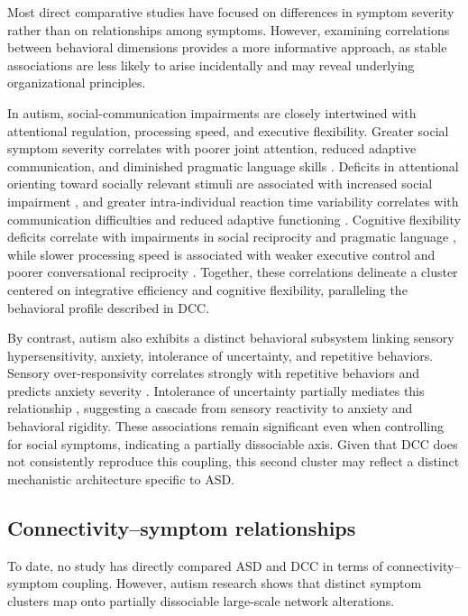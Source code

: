 \documentclass{article}
\begin{document}
Most direct comparative studies have focused on differences in symptom severity rather than on relationships among symptoms. However, examining correlations between behavioral dimensions provides a more informative approach, as stable associations are less likely to arise incidentally and may reveal underlying organizational principles.

In autism, social-communication impairments are closely intertwined with attentional regulation, processing speed, and executive flexibility. Greater social symptom severity correlates with poorer joint attention, reduced adaptive communication, and diminished pragmatic language skills \citep{Mundy2007,TagerFlusberg2006}. Deficits in attentional orienting toward socially relevant stimuli are associated with increased social impairment \citep{Keehn2013}, and greater intra-individual reaction time variability correlates with communication difficulties and reduced adaptive functioning \citep{Dinstein2012}. Cognitive flexibility deficits correlate with impairments in social reciprocity and pragmatic language \citep{Lopez2005}, while slower processing speed is associated with weaker executive control and poorer conversational reciprocity \citep{Marco2012}. Together, these correlations delineate a cluster centered on integrative efficiency and cognitive flexibility, paralleling the behavioral profile described in DCC.

By contrast, autism also exhibits a distinct behavioral subsystem linking sensory hypersensitivity, anxiety, intolerance of uncertainty, and repetitive behaviors. Sensory over-responsivity correlates strongly with repetitive behaviors and predicts anxiety severity \citep{Schulz2019,Green2015}. Intolerance of uncertainty partially mediates this relationship \citep{Wigham2015}, suggesting a cascade from sensory reactivity to anxiety and behavioral rigidity. These associations remain significant even when controlling for social symptoms, indicating a partially dissociable axis. Given that DCC does not consistently reproduce this coupling, this second cluster may reflect a distinct mechanistic architecture specific to ASD.

\subsection{Connectivity--symptom relationships}

To date, no study has directly compared ASD and DCC in terms of connectivity–symptom coupling. However, autism research shows that distinct symptom clusters map onto partially dissociable large-scale network alterations.
\end{document}

